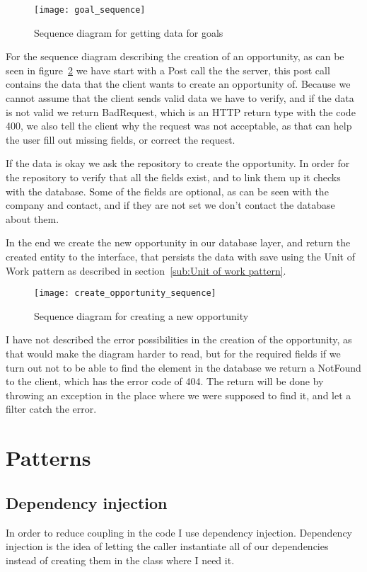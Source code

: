 \begin{figure}[!htbp]
\centering
\texttt{[image: goal\_sequence]}
\caption{Sequence diagram for getting data for goals}
\label{fig:goal_sequence}
\end{figure}

For the sequence diagram describing the creation of an opportunity, as can be
seen in figure~\ref{fig:opportunity_sequence} we have start with a Post call the
the server, this post call contains the data that the client wants to create an
opportunity of. Because we cannot assume that the client sends valid data we have
to verify, and if the data is not valid we return BadRequest, which is an HTTP
return type with the code 400, we also tell the client why the request was not
acceptable, as that can help the user fill out missing fields, or correct the
request. 

If the data is okay we ask the repository to create the opportunity. In order
for the repository to verify that all the fields exist, and to link them up it
checks with the database. Some of the fields are optional, as can be seen with
the company and contact, and if they are not set we don't contact the database
about them.

In the end we create the new opportunity in our database layer, and return the
created entity to the interface, that persists the data with save using the Unit
of Work pattern as described in section~\ref{sub:Unit of work pattern}.

\begin{figure}[!htb]
  \centering
  \texttt{[image: create\_opportunity\_sequence]}
  \caption{Sequence diagram for creating a new opportunity}
  \label{fig:opportunity_sequence}
\end{figure}

I have not described the error possibilities in the creation of the opportunity,
as that would make the diagram harder to read, but for the required fields if we
turn out not to be able to find the element in the database we return a NotFound
to the client, which has the error code of 404. The return will be done by
throwing an exception in the place where we were supposed to find it, and let a
filter catch the error.

\section{Patterns}
\label{sec:Patterns}

\subsection{Dependency injection}
\label{sub:Dependency injection}
In order to reduce coupling in the code I use dependency injection.
Dependency injection is the idea of letting the caller instantiate all of our
dependencies instead of creating them in the class where I need it. 

